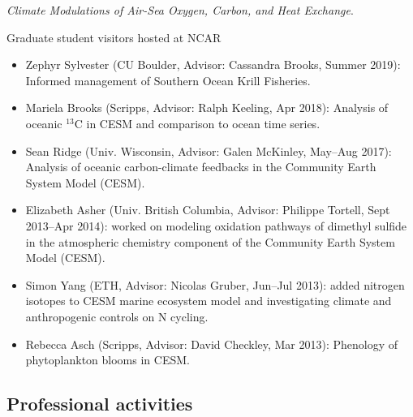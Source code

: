 \documentclass[11pt]{article}
\begin{document}
\begin{description}[style=multiline,leftmargin=0.5cm,font=\normalfont]
\begin{itemize}
	\textit{Climate Modulations of Air-Sea Oxygen, Carbon, and Heat Exchange}.
	\end{itemize}
\item Graduate student visitors hosted at NCAR
	\begin{itemize}
	\item Zephyr Sylvester (CU Boulder, Advisor: Cassandra Brooks, Summer 2019):
	  Informed management of Southern Ocean Krill Fisheries.
	\item Mariela Brooks (Scripps, Advisor: Ralph Keeling, Apr 2018):
	Analysis of oceanic {$^{13}$C} in CESM and comparison to ocean time series.
	\item Sean Ridge (Univ. Wisconsin, Advisor: Galen McKinley, May--Aug 2017):
		Analysis of oceanic carbon-climate feedbacks in the Community Earth System Model (CESM).
	\item Elizabeth Asher (Univ. British Columbia, Advisor: Philippe Tortell, Sept 2013--Apr 2014):
		worked on modeling oxidation pathways of dimethyl sulfide in the
		atmospheric chemistry component of the
		Community Earth System Model (CESM).
	\item Simon Yang (ETH, Advisor: Nicolas Gruber, Jun--Jul 2013):
	added nitrogen isotopes to CESM marine ecosystem model and investigating
	climate and anthropogenic controls on N cycling.
	\item Rebecca Asch (Scripps, Advisor: David Checkley, Mar 2013):
	Phenology of phytoplankton blooms in CESM. \\
	\end{itemize}
\end{description}


\subsection*{Professional activities}
\end{document}
